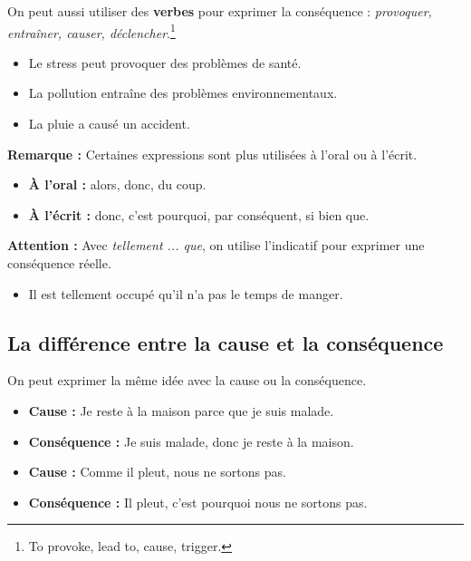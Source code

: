 \documentclass[math,code]{amznotes}
\theoremstyle{remark}
\begin{document}
On peut aussi utiliser des \textbf{verbes} pour exprimer la conséquence : \textit{provoquer, entraîner, causer, déclencher}.\footnote{To provoke, lead to, cause, trigger.}

\begin{itemize}
    \item Le stress peut provoquer des problèmes de santé.
    \item La pollution entraîne des problèmes environnementaux.
    \item La pluie a causé un accident.
\end{itemize}

\begin{notebox}
\textbf{Remarque :} Certaines expressions sont plus utilisées à l'oral ou à l'écrit.

\begin{itemize}
    \item \textbf{À l'oral :} alors, donc, du coup.
    \item \textbf{À l'écrit :} donc, c'est pourquoi, par conséquent, si bien que.
\end{itemize}

\textbf{Attention :} Avec \textit{tellement ... que}, on utilise l'indicatif pour exprimer une conséquence réelle.

\begin{itemize}
    \item Il est tellement occupé qu'il n'a pas le temps de manger.
\end{itemize}
\end{notebox}

\subsection*{La différence entre la cause et la conséquence}

On peut exprimer la même idée avec la cause ou la conséquence.

\begin{itemize}
    \item \textbf{Cause :} Je reste à la maison parce que je suis malade.
    \item \textbf{Conséquence :} Je suis malade, donc je reste à la maison.
\end{itemize}

\begin{itemize}
    \item \textbf{Cause :} Comme il pleut, nous ne sortons pas.
    \item \textbf{Conséquence :} Il pleut, c'est pourquoi nous ne sortons pas.
\end{itemize}
\end{document}
